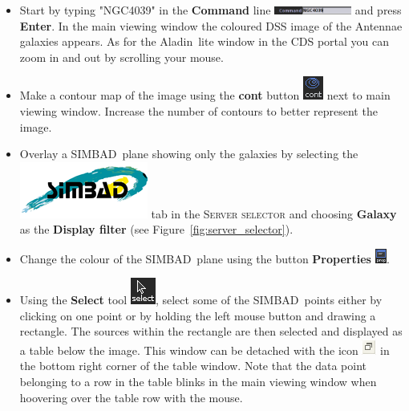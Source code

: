 \documentclass [a4paper, 12pt]{article}
\newcommand{\aladin}{{\textsc{A}{ladin}}}
\newcommand{\simbad}{{\textsc{SIMBAD}}}
\begin{document}
\begin{itemize}
    \item Start by typing "NGC4039" in the \textbf{Command} line 
\includegraphics[width=0.2\textwidth]{../images/aladin_command_ngc4039.png} 
and press \textbf{Enter}. In the main viewing window the coloured DSS image of 
the Antennae galaxies appears. As for the \aladin\ lite window in the CDS 
portal you can zoom in and out by scrolling your mouse. 

    \item Make a contour map of the image using the \textbf{cont} button 
\includegraphics[width=0.03  \textwidth]{../images/aladin_button_contours.png} 
next to main viewing window. Increase the number of contours to better 
represent the image. 
    
    \item Overlay a \simbad\ plane showing only the galaxies by selecting 
the \includegraphics[width=0.055  \textwidth]{../images/logo_simbad.png} tab  
in 
the 
\textsc{Server selector} and choosing \textbf{Galaxy} as the \textbf{Display 
filter} (see Figure~\ref{fig:server_selector}).

    \item Change the colour of the \simbad\ plane using the button 
\textbf{Properties} 
\includegraphics[width=0.03\textwidth]{../images/aladin_button_properties.png}. 
 

    \item Using the \textbf{Select} tool \includegraphics[width=0.03  
\textwidth]{../images/aladin_button_select.png}, select some of the \simbad\ 
points either by clicking on one point or by holding the left mouse button and 
drawing a rectangle. The sources within the rectangle are then selected and 
displayed as a table below the image. This window can be detached with the icon 
\includegraphics[width=0.035  
\textwidth]{../images/aladin_button_detach-table.png} in the bottom right 
corner of the table window. Note that the data point 
belonging to a row in the table blinks in the main viewing window when 
hoovering over the table row with the mouse.


\end{itemize}
\end{document}
